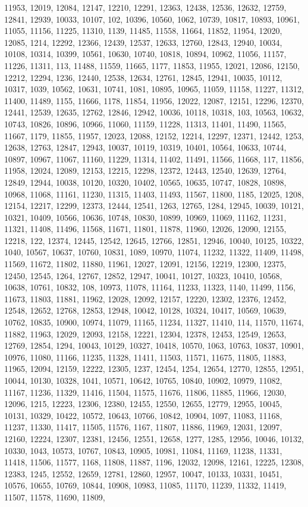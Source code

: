 \documentclass{article} \usepackage{hyperref}
\begin{document}
11953, 12019, 12084, 12147, 12210, 12291, 12363, 12438, 12536, 12632, 12759, 12841, 12939, 10033, 10107, 102, 10396, 10560, 1062, 10739, 10817, 10893, 10961, 11055, 11156, 11225, 11310, 1139, 11485, 11558, 11664, 11852, 11954, 12020, 12085, 1214, 12292, 12366, 12439, 12537, 12633, 12760, 12843, 12940, 10034, 10108, 10314, 10399, 10561, 10630, 10740, 10818, 10894, 10962, 11056, 11157, 11226, 11311, 113, 11488, 11559, 11665, 1177, 11853, 11955, 12021, 12086, 12150, 12212, 12294, 1236, 12440, 12538, 12634, 12761, 12845, 12941, 10035, 10112, 10317, 1039, 10562, 10631, 10741, 1081, 10895, 10965, 11059, 11158, 11227, 11312, 11400, 11489, 1155, 11666, 1178, 11854, 11956, 12022, 12087, 12151, 12296, 12370, 12441, 12539, 12635, 12762, 12846, 12942, 10036, 10118, 10318, 103, 10563, 10632, 10743, 10826, 10896, 10966, 11060, 11159, 11228, 11313, 11401, 11490, 11565, 11667, 1179, 11855, 11957, 12023, 12088, 12152, 12214, 12297, 12371, 12442, 1253, 12638, 12763, 12847, 12943, 10037, 10119, 10319, 10401, 10564, 10633, 10744, 10897, 10967, 11067, 11160, 11229, 11314, 11402, 11491, 11566, 11668, 117, 11856, 11958, 12024, 12089, 12153, 12215, 12298, 12372, 12443, 12540, 12639, 12764, 12849, 12944, 10038, 10120, 10320, 10402, 10565, 10635, 10747, 10828, 10898, 10968, 11068, 11161, 11230, 11315, 11403, 11493, 11567, 11800, 1185, 12025, 1208, 12154, 12217, 12299, 12373, 12444, 12541, 1263, 12765, 1284, 12945, 10039, 10121, 10321, 10409, 10566, 10636, 10748, 10830, 10899, 10969, 11069, 11162, 11231, 11321, 11408, 11496, 11568, 11671, 11801, 11878, 11960, 12026, 12090, 12155, 12218, 122, 12374, 12445, 12542, 12645, 12766, 12851, 12946, 10040, 10125, 10322, 1040, 10567, 10637, 10760, 10831, 1089, 10970, 11074, 11232, 11322, 11409, 11498, 11569, 11672, 11802, 11880, 11961, 12027, 12091, 12156, 12219, 12300, 12375, 12450, 12545, 1264, 12767, 12852, 12947, 10041, 10127, 10323, 10410, 10568, 10638, 10761, 10832, 108, 10973, 11078, 11164, 11233, 11323, 1140, 11499, 1156, 11673, 11803, 11881, 11962, 12028, 12092, 12157, 12220, 12302, 12376, 12452, 12548, 12652, 12768, 12853, 12948, 10042, 10128, 10324, 10417, 10569, 10639, 10762, 10835, 10900, 10974, 11079, 11165, 11234, 11327, 11410, 114, 11570, 11674, 11882, 11963, 12029, 12093, 12158, 12221, 12304, 12378, 12453, 12549, 12653, 12769, 12854, 1294, 10043, 10129, 10327, 10418, 10570, 1063, 10763, 10837, 10901, 10976, 11080, 11166, 11235, 11328, 11411, 11503, 11571, 11675, 11805, 11883, 11965, 12094, 12159, 12222, 12305, 1237, 12454, 1254, 12654, 12770, 12855, 12951, 10044, 10130, 10328, 1041, 10571, 10642, 10765, 10840, 10902, 10979, 11082, 11167, 11236, 11329, 11416, 11504, 11575, 11676, 11806, 11885, 11966, 12030, 12096, 1215, 12223, 12306, 12380, 12455, 12550, 12655, 12779, 12955, 10045, 10131, 10329, 10422, 10572, 10643, 10766, 10842, 10904, 1097, 11083, 11168, 11237, 11330, 11417, 11505, 11576, 1167, 11807, 11886, 11969, 12031, 12097, 12160, 12224, 12307, 12381, 12456, 12551, 12658, 1277, 1285, 12956, 10046, 10132, 10330, 1043, 10573, 10767, 10843, 10905, 10981, 11084, 11169, 11238, 11331, 11418, 11506, 11577, 1168, 11808, 11887, 1196, 12032, 12098, 12161, 12225, 12308, 12383, 1245, 12552, 12659, 12781, 12860, 12957, 10047, 10133, 10331, 10451, 10576, 10655, 10769, 10844, 10908, 10983, 11085, 11170, 11239, 11332, 11419, 11507, 11578, 11690, 11809, 
\end{document}
